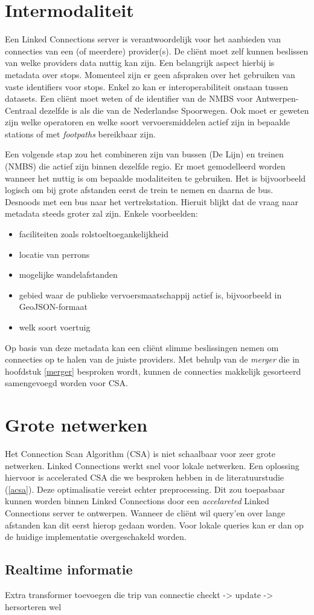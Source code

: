\section{Intermodaliteit}

Een Linked Connections server is verantwoordelijk voor het aanbieden van connecties van een (of meerdere) provider(s). De cli\"ent moet zelf kunnen beslissen van welke providers data nuttig kan zijn. Een belangrijk aspect hierbij is metadata over stops. Momenteel zijn er geen afspraken over het gebruiken van vaste identifiers voor stops. Enkel zo kan er interoperabiliteit onstaan tussen datasets. Een cli\"ent moet weten of de identifier van de NMBS voor Antwerpen-Centraal dezelfde is als die van de Nederlandse Spoorwegen. Ook moet er geweten zijn welke operatoren en welke soort vervoersmiddelen actief zijn in bepaalde stations of met \textit{footpaths} bereikbaar zijn. 

Een volgende stap zou het combineren zijn van bussen (De Lijn) en treinen (NMBS) die actief zijn binnen dezelfde regio. Er moet gemodelleerd worden wanneer het nuttig is om bepaalde modaliteiten te gebruiken. Het is bijvoorbeeld logisch om bij grote afstanden eerst de trein te nemen en daarna de bus. Desnoods met een bus naar het vertrekstation. Hieruit blijkt dat de vraag naar metadata steeds groter zal zijn. Enkele voorbeelden:

\begin{itemize}
\item faciliteiten zoals rolstoeltoegankelijkheid
\item locatie van perrons
\item mogelijke wandelafstanden
\item gebied waar de publieke vervoersmaatschappij actief is, bijvoorbeeld in GeoJSON-formaat
\item welk soort voertuig
\end{itemize}

Op basis van deze metadata kan een cli\"ent slimme beslissingen nemen om connecties op te halen van de juiste providers. Met behulp van de \textit{merger} die in hoofdstuk \ref{merger} besproken wordt, kunnen de connecties makkelijk gesorteerd samengevoegd worden voor CSA.

\section{Grote netwerken}

Het Connection Scan Algorithm (CSA) is niet schaalbaar voor zeer grote netwerken. Linked Connections werkt snel voor lokale netwerken. Een oplossing hiervoor is  accelerated CSA die we besproken hebben in de literatuurstudie (\ref{acsa}). Deze optimalisatie vereist echter preprocessing. Dit zou toepasbaar kunnen worden binnen Linked Connections door een \textit{accelareted} Linked Connections server te ontwerpen. Wanneer de cli\"ent wil query'en over lange afstanden kan dit eerst hierop gedaan worden. Voor lokale queries kan er dan op de huidige implementatie overgeschakeld worden. 

\subsection{Realtime informatie}

Extra transformer toevoegen die trip van connectie checkt -> update -> hersorteren wel
